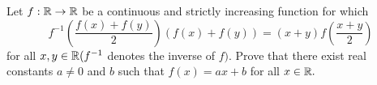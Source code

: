 Let ${f : \Bbb{R} \rightarrow \Bbb{R}}$ be a continuous and strictly increasing function for which
\[ \displaystyle f^{-1}\left(\frac{f(x)+f(y)}{2}\right)(f(x)+f(y)) =(x+y)f\left(\frac{x+y}{2}\right) \]
for all ${x,y \in \Bbb{R}} ({f^{-1}}$ denotes the inverse of ${f})$. Prove that there exist real constants ${a \neq 0}$ and ${b}$ such that ${f(x)=ax+b}$ for all ${x \in \Bbb{R}}.$

